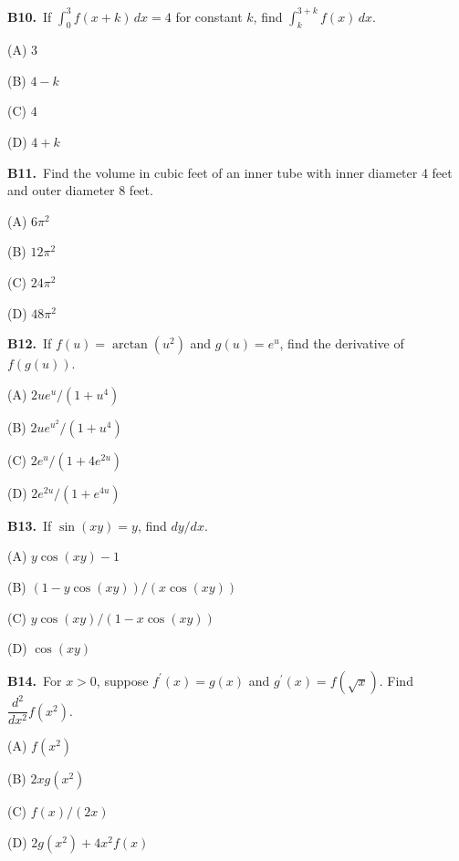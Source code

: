 \documentclass[11pt]{article}
\begin{document}
\bigskip\noindent\textbf{B10.}\ If $\int_0^3 f(x+k)\,dx=4$ for constant $k$, find $\int_k^{3+k}f(x)\,dx$.
\begin{list}{}{\setlength{\leftmargin}{3em}\setlength{\labelwidth}{2.5em}\setlength{\itemsep}{0pt}\setlength{\topsep}{2pt}}
\item[(A)] $3$
\item[(B)] $4-k$
\item[(C)] $4$
\item[(D)] $4+k$
\end{list}

\bigskip\noindent\textbf{B11.}\ Find the volume in cubic feet of an inner tube with inner diameter 4 feet and outer diameter 8 feet.
\begin{list}{}{\setlength{\leftmargin}{3em}\setlength{\labelwidth}{2.5em}\setlength{\itemsep}{0pt}\setlength{\topsep}{2pt}}
\item[(A)] $6\pi^2$
\item[(B)] $12\pi^2$
\item[(C)] $24\pi^2$
\item[(D)] $48\pi^2$
\end{list}

\bigskip\noindent\textbf{B12.}\ If $f(u)=\arctan(u^2)$ and $g(u)=e^u$, find the derivative of $f(g(u))$.
\begin{list}{}{\setlength{\leftmargin}{3em}\setlength{\labelwidth}{2.5em}\setlength{\itemsep}{0pt}\setlength{\topsep}{2pt}}
\item[(A)] $2ue^u/(1+u^4)$
\item[(B)] $2ue^{u^2}/(1+u^4)$
\item[(C)] $2e^u/(1+4e^{2u})$
\item[(D)] $2e^{2u}/(1+e^{4u})$
\end{list}

\bigskip\noindent\textbf{B13.}\ If $\sin(xy)=y$, find $dy/dx$.
\begin{list}{}{\setlength{\leftmargin}{3em}\setlength{\labelwidth}{2.5em}\setlength{\itemsep}{0pt}\setlength{\topsep}{2pt}}
\item[(A)] $y\cos(xy)-1$
\item[(B)] $(1-y\cos(xy))/(x\cos(xy))$
\item[(C)] $y\cos(xy)/(1-x\cos(xy))$
\item[(D)] $\cos(xy)$
\end{list}

\bigskip\noindent\textbf{B14.}\ For $x>0$, suppose $f^{\prime}(x)=g(x)$ and $g^{\prime}(x)=f(\sqrt x)$. Find $\dfrac{d^2}{dx^2}f(x^2)$.
\begin{list}{}{\setlength{\leftmargin}{3em}\setlength{\labelwidth}{2.5em}\setlength{\itemsep}{0pt}\setlength{\topsep}{2pt}}
\item[(A)] $f(x^2)$
\item[(B)] $2xg(x^2)$
\item[(C)] $f(x)/(2x)$
\item[(D)] $2g(x^2)+4x^2f(x)$
\end{list}
\end{document}
